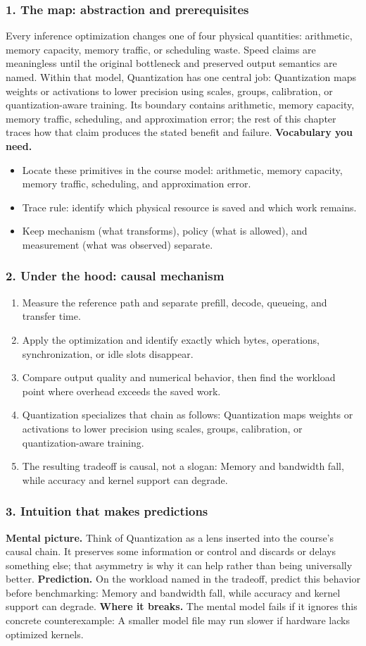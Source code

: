 \subsubsection*{1. The map: abstraction and prerequisites}
Every inference optimization changes one of four physical quantities: arithmetic, memory capacity, memory traffic, or scheduling waste. Speed claims are meaningless until the original bottleneck and preserved output semantics are named.
Within that model, Quantization has one central job: Quantization maps weights or activations to lower precision using scales, groups, calibration, or quantization-aware training. Its boundary contains arithmetic, memory capacity, memory traffic, scheduling, and approximation error; the rest of this chapter traces how that claim produces the stated benefit and failure.
\textbf{Vocabulary you need.}\begin{itemize}
\item Locate these primitives in the course model: arithmetic, memory capacity, memory traffic, scheduling, and approximation error.
\item Trace rule: identify which physical resource is saved and which work remains.
\item Keep mechanism (what transforms), policy (what is allowed), and measurement (what was observed) separate.
\end{itemize}
\subsubsection*{2. Under the hood: causal mechanism}\begin{enumerate}
\item Measure the reference path and separate prefill, decode, queueing, and transfer time.
\item Apply the optimization and identify exactly which bytes, operations, synchronization, or idle slots disappear.
\item Compare output quality and numerical behavior, then find the workload point where overhead exceeds the saved work.
\item Quantization specializes that chain as follows: Quantization maps weights or activations to lower precision using scales, groups, calibration, or quantization-aware training.
\item The resulting tradeoff is causal, not a slogan: Memory and bandwidth fall, while accuracy and kernel support can degrade.
\end{enumerate}
\subsubsection*{3. Intuition that makes predictions}
\textbf{Mental picture.} Think of Quantization as a lens inserted into the course's causal chain. It preserves some information or control and discards or delays something else; that asymmetry is why it can help rather than being universally better.
\textbf{Prediction.} On the workload named in the tradeoff, predict this behavior before benchmarking: Memory and bandwidth fall, while accuracy and kernel support can degrade.
\textbf{Where it breaks.} The mental model fails if it ignores this concrete counterexample: A smaller model file may run slower if hardware lacks optimized kernels.
